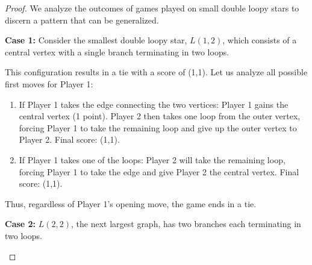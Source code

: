 \documentclass{article}
\begin{document}
\begin{proof}
We analyze the outcomes of games played on small double loopy stars to discern a pattern that can be generalized.

\textbf{Case 1:} Consider the smallest double loopy star, $L(1, 2)$, which consists of a central vertex with a single branch terminating in two loops.

\begin{center}
\end{center}

This configuration results in a tie with a score of (1,1). Let us analyze all possible first moves for Player 1:

\begin{enumerate}
    \item If Player 1 takes the edge connecting the two vertices: Player 1 gains the central vertex (1 point). Player 2 then takes one loop from the outer vertex, forcing Player 1 to take the remaining loop and give up the outer vertex to Player 2. Final score: (1,1).
    
    \item If Player 1 takes one of the loops: Player 2 will take the remaining loop, forcing Player 1 to take the edge and give Player 2 the central vertex. Final score: (1,1).
\end{enumerate}

Thus, regardless of Player 1's opening move, the game ends in a tie.

\textbf{Case 2:} $L(2, 2)$, the next largest graph, has two branches each terminating in two loops.

\begin{center}
\end{center}


\end{proof}
\end{document}
